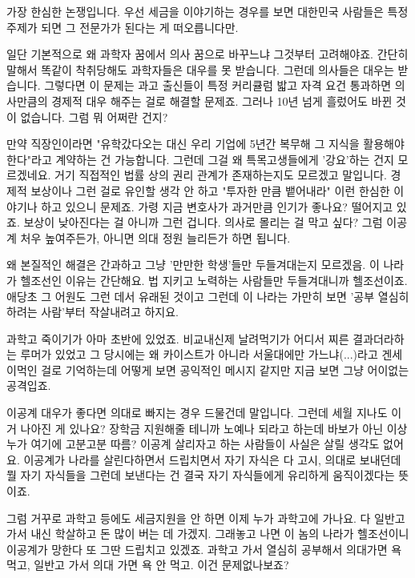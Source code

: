 \begin{enumerate}
    가장 한심한 논쟁입니다.
    우선 세금을 이야기하는 경우를 보면 대한민국 사람들은 특정 주제가 되면 그 전문가가 된다는 게 떠오릅니다만.
    \vspace{5mm}

    일단 기본적으로 왜 과학자 꿈에서 의사 꿈으로 바꾸느냐 그것부터 고려해야죠.
    간단히 말해서 똑같이 착취당해도 과학자들은 대우를 못 받습니다. 그런데 의사들은 대우는 받습니다.
    그렇다면 이 문제는 과고 출신들이 특정 커리큘럼 밟고 자격 요건 통과하면 의사만큼의 경제적 대우 해주는 걸로 해결할 문제죠.
    그러나 10년 넘게 흘렀어도 바뀐 것이 없습니다. 그럼 뭐 어쩌란 건지?
    \vspace{5mm}

    만약 직장인이라면 "유학갔다오는 대신 우리 기업에 5년간 복무해 그 지식을 활용해야한다"라고 계약하는 건 가능합니다.
    그런데 그걸 왜 특목고생들에게 '강요'하는 건지 모르겠네요. 거기 직접적인 법률 상의 권리 관계가 존재하는지도 모르겠고 말입니다.
    경제적 보상이나 그런 걸로 유인할 생각 안 하고 "투자한 만큼 뱉어내라" 이런 한심한 이야기나 하고 있으니 문제죠.
    가령 지금 변호사가 과거만큼 인기가 좋나요? 떨어지고 있죠. 보상이 낮아진다는 걸 아니까 그런 겁니다.
    의사로 몰리는 걸 막고 싶다? 그럼 이공계 처우 높여주든가, 아니면 의대 정원 늘리든가 하면 됩니다.
    \vspace{5mm}

    왜 본질적인 해결은 간과하고 그냥 '만만한 학생'들만 두들겨대는지 모르겠음.
    이 나라가 헬조선인 이유는 간단해요. 법 지키고 노력하는 사람들만 두들겨대니까 헬조선이죠. 애당초 그 어원도 그런 데서 유래된 것이고
    그런데 이 나라는 가만히 보면 '공부 열심히 하려는 사람'부터 작살내려고 하지요.
    \vspace{5mm}

    과학고 죽이기가 아마 초반에 있었죠. 비교내신제 날려먹기가 어디서 찌른 결과더라하는 루머가 있었고
    그 당시에는 왜 카이스트가 아니라 서울대에만 가느냐(...)라고 겐세이먹인 걸로 기억하는데
    어떻게 보면 공익적인 메시지 같지만 지금 보면 그냥 어이없는 공격입죠.
    \vspace{5mm}

    이공계 대우가 좋다면 의대로 빠지는 경우 드물건데 말입니다. 그런데 세월 지나도 이거 나아진 게 있나요?
    장학금 지원해줄 테니까 노예나 되라고 하는데 바보가 아닌 이상 누가 여기에 고분고분 따름?
    이공계 살리자고 하는 사람들이 사실은 살릴 생각도 없어요. 이공계가 나라를 살린다하면서 드립치면서 자기 자식은 다 고시, 의대로 보내던데 뭘
    자기 자식들을 그런데 보낸다는 건 결국 자기 자식들에게 유리하게 움직이겠다는 뜻이죠.
    \vspace{5mm}

    그럼 거꾸로 과학고 등에도 세금지원을 안 하면 이제 누가 과학고에 가나요. 다 일반고 가서 내신 학살하고 돈 많이 버는 데 가겠지.
    그래놓고 나면 이 놈의 나라가 헬조선이니 이공계가 망한다 또 그딴  드립치고 있겠죠.
    과학고 가서 열심히 공부해서 의대가면 욕먹고, 일반고 가서 의대 가면 욕 안 먹고. 이건 문제없나보죠?
    \vspace{5mm}



\end{enumerate}

